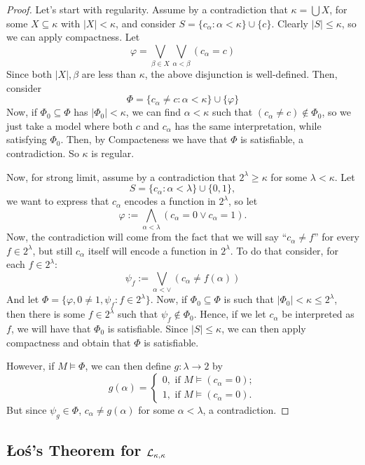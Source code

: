 \begin{proof}
    Let's start with regularity. Assume by a contradiction that $\kappa=\bigcup X$, for some $X\subseteq\kappa$ with $\lvert X\rvert<\kappa$, and consider $S=\{c_\alpha:\alpha<\kappa\}\cup\{c\}$. Clearly $\lvert S\rvert\leq\kappa$, so we can apply compactness. Let
    $$\varphi=\bigvee_{\beta\in X}\bigvee_{\alpha<\beta}(c_\alpha=c)$$
    Since both $\lvert X\rvert,\beta$ are less than $\kappa$, the above disjunction is well-defined. Then, consider
    $$\Phi=\{c_\alpha\neq c:\alpha<\kappa\}\cup\{\varphi\}$$
    Now, if $\Phi_0\subseteq\Phi$ has $\lvert\Phi_0\rvert<\kappa$, we can find $\alpha<\kappa$ such that $(c_\alpha\neq c)\notin\Phi_0$, so we just take a model where both $c$ and $c_\alpha$ has the same interpretation, while satisfying $\Phi_0$. Then, by Compacteness we have that $\Phi$ is satisfiable, a contradiction. So $\kappa$ is regular.

    Now, for strong limit, assume by a contradiction that $2^\lambda\geq\kappa$ for some $\lambda<\kappa$. Let
    $$S=\{c_\alpha:\alpha<\lambda\}\cup\{0,1\},$$
    we want to express that $c_\alpha$ encodes a function in $2^\lambda$, so let
    $$\varphi:=\bigwedge_{\alpha<\lambda}(c_\alpha=0\vee c_\alpha=1).$$
    Now, the contradiction will come from the fact that we will say ``$c_\alpha\neq f$'' for every $f\in2^\lambda$, but still $c_\alpha$ itself will encode a function in $2^\lambda$. To do that consider, for each $f\in2^\lambda$:
    $$\psi_f:=\bigvee_{\alpha<\vee}(c_\alpha\neq f(\alpha))$$
    And let $\Phi=\{\varphi,0\neq1,\psi_f:f\in2^\lambda\}$. Now, if $\Phi_0\subseteq\Phi$ is such that $\lvert\Phi_0\rvert<\kappa\leq2^\lambda$, then there is some $f\in2^\lambda$ such that $\psi_f\notin\Phi_0$. Hence, if we let $c_\alpha$ be interpreted as $f$, we will have that $\Phi_0$ is satisfiable. Since $\lvert S\rvert\leq\kappa$, we can then apply compactness and obtain that $\Phi$ is satisfiable.

    However, if $M\vDash\Phi$, we can then define $g:\lambda\to2$ by
    $$g(\alpha)=\begin{cases}
        0,\text{ if }M\vDash(c_\alpha=0);\\
        1,\text{ if }M\vDash(c_\alpha=0).
    \end{cases}$$
    But since $\psi_g\in\Phi$, $c_\alpha\neq g(\alpha)$ for some $\alpha<\lambda$, a contradiction.
\end{proof}

\subsection{Łoś's Theorem for \texorpdfstring{$\mathcal{L}_{\kappa,\kappa}$}{Lkk}}


